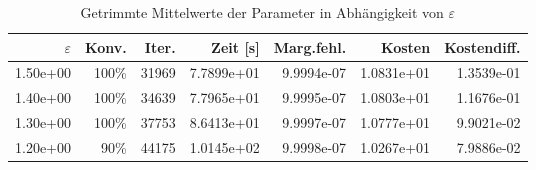 \begin{table}[htbp]
\caption{Getrimmte Mittelwerte der Parameter in Abhängigkeit von $\varepsilon$}
\label{tab:Parametertest2048_1_1}
\small
\centering
{}
\begin{tabular}{rrrrrrr}
\toprule
$\varepsilon$ & Konv. & Iter. & Zeit [s] & Marg.fehl. & Kosten & Kostendiff. \\
\midrule
1.50e+00 & 100\% & 31969 & 7.7899e+01 & 9.9994e-07 & 1.0831e+01 & 1.3539e-01 \\
1.40e+00 & 100\% & 34639 & 7.7965e+01 & 9.9995e-07 & 1.0803e+01 & 1.1676e-01 \\
1.30e+00 & 100\% & 37753 & 8.6413e+01 & 9.9997e-07 & 1.0777e+01 & 9.9021e-02 \\
1.20e+00 & 90\% & 44175 & 1.0145e+02 & 9.9998e-07 & 1.0267e+01 & 7.9886e-02 \\
\bottomrule
\end{tabular}
\end{table}
